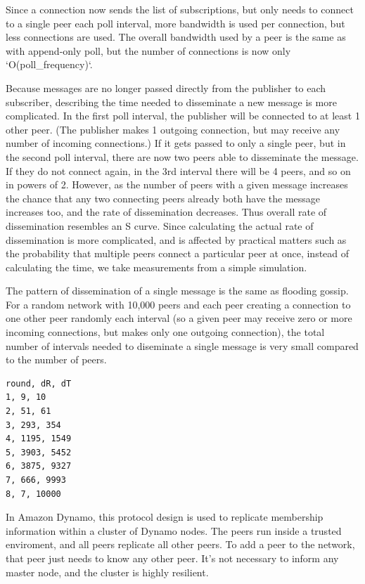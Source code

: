 \documentclass[sigconf]{acmart}
\begin{document}
Since a connection now sends the list of subscriptions, but only needs
to connect to a single peer each poll interval, more bandwidth is used
per connection, but less connections are used.  The overall bandwidth
used by a peer is the same as with append-only poll, but the number of
connections is now only `O(poll\_frequency)`.

Because messages are no longer passed directly from the publisher to
each subscriber, describing the time needed to disseminate a new
message is more complicated.  In the first poll interval, the
publisher will be connected to at least 1 other peer.  (The publisher
makes 1 outgoing connection, but may receive any number of incoming
connections.)  If it gets passed to only a single peer, but in the
second poll interval, there are now two peers able to disseminate the
message. If they do not connect again, in the 3rd interval there will
be 4 peers, and so on in powers of 2. However, as the number of peers
with a given message increases the chance that any two connecting
peers already both have the message increases too, and the rate of
dissemination decreases. Thus overall rate of dissemination resembles
an S curve. Since calculating the actual rate of dissemination is more
complicated, and is affected by practical matters such as the
probability that multiple peers connect a particular peer at once,
instead of calculating the time, we take measurements from a simple
simulation.

The pattern of dissemination of a single message is the same as
flooding gossip.  For a random network with 10,000 peers and each peer
creating a connection to one other peer randomly each interval (so a
given peer may receive zero or more incoming connections, but makes
only one outgoing connection), the total number of intervals needed to
diseminate a single message is very small compared to the number of
peers.

\begin{verbatim}
round, dR, dT
1, 9, 10
2, 51, 61
3, 293, 354
4, 1195, 1549
5, 3903, 5452
6, 3875, 9327
7, 666, 9993
8, 7, 10000
\end{verbatim}

In Amazon Dynamo, this protocol design is used to replicate membership
information within a cluster of Dynamo nodes.  The peers run inside a
trusted enviroment, and all peers replicate all other peers. To add a
peer to the network, that peer just needs to know any other peer. It's
not necessary to inform any master node, and the cluster is highly
resilient.
\end{document}
